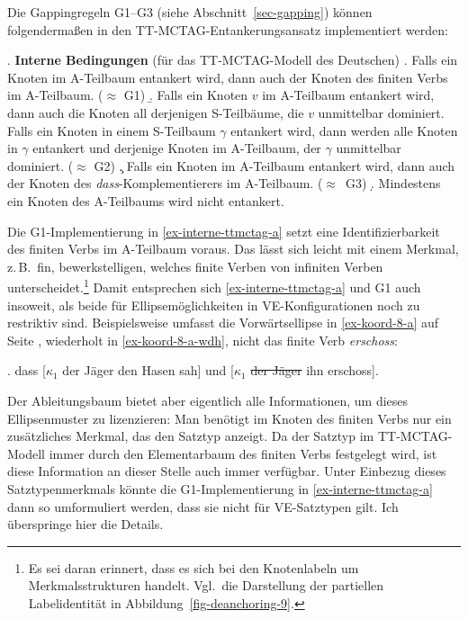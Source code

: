 Die Gappingregeln G1--G3 (siehe Abschnitt~\ref{sec-gapping}) können folgenderma\ss en in den TT-MC\-TAG-Entankerungsansatz implementiert werden: 

\ex. {\bf Interne Bedingungen} (für das TT-MCTAG-Modell des Deutschen) \label{ex-interne-ttmctag}
\a. Falls ein Knoten im A-Teilbaum entankert wird, dann auch der Knoten des finiten Verbs im A-Teilbaum. ($\approx$ G1)\label{ex-interne-ttmctag-a}
\b. Falls ein Knoten $v$ im A-Teilbaum entankert wird, dann auch die Knoten all derjenigen S-Teilbäume, die $v$ unmittelbar dominiert. Falls ein Knoten in einem S-Teilbaum $\gamma$ entankert wird, dann werden alle Knoten in $\gamma$ entankert und derjenige Knoten im A-Teilbaum, der $\gamma$ unmittelbar dominiert. ($\approx$ G2)\label{ex-interne-ttmctag-b}
\c. Falls ein Knoten im A-Teilbaum entankert wird, dann auch der Knoten des \emph{dass}-Komplementierers im A-Teilbaum. ($\approx$~G3)\label{ex-interne-ttmctag-c}
\d. Mindestens ein Knoten des A-Teilbaums wird nicht entankert.\label{ex-interne-ttmctag-d} %
 
Die G1-Implementierung in \ref{ex-interne-ttmctag-a} setzt eine Identifizierbarkeit des finiten Verbs im A-Teil\-baum voraus. Das lässt sich leicht mit einem Merkmal, z.\,B.\ {\sc fin}, bewerkstelligen, welches finite Verben von infiniten Verben unterscheidet.\footnote{Es sei daran erinnert, dass es sich bei den Knotenlabeln um Merkmalsstrukturen handelt. Vgl.\ die Darstellung der partiellen Labelidentität in Abbildung~\ref{fig-deanchoring-9}.} Damit entsprechen sich \ref{ex-interne-ttmctag-a} und G1 auch insoweit, als beide für Ellipsemöglichkeiten in VE-Konfigurationen noch zu restriktiv sind. Beispielsweise umfasst die Vorwärtsellipse in \ref{ex-koord-8-a} auf Seite \pageref{ex-koord-8-a}, wiederholt in \ref{ex-koord-8-a-wdh}, nicht das finite Verb {\it erschoss}: 

\ex. \label{ex-koord-8-a-wdh}dass [$\kappa_1$ der Jäger den Hasen sah] und [$\kappa_1$ \sout{der Jäger} ihn erschoss].    

Der Ableitungsbaum bietet aber eigentlich alle Informationen, um dieses Ellipsenmuster zu lizenzieren: Man benötigt im Knoten des finiten Verbs nur ein zusätzliches Merkmal, das den Satztyp anzeigt. Da der Satztyp im TT-MCTAG-Modell immer durch den Elementarbaum des finiten Verbs festgelegt wird, ist diese Information an dieser Stelle auch immer verfügbar. Unter Einbezug dieses Satztypenmerkmals könnte die G1-Implementierung in \ref{ex-interne-ttmctag-a} dann so umformuliert werden, dass sie nicht für VE-Satztypen gilt. Ich überspringe hier die Details. 


